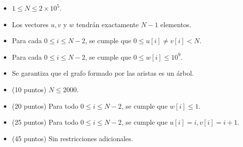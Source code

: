 \documentclass[12pt]{scrartcl}
\begin{document}
        


    \eject
    
        \begin{itemize}
            \item $1 \le N \le 2\times10^5$.
            \item Los vectores $u, v$ y $w$ tendrán exactamente $N - 1$ elementos.
            \item Para cada $0 \le i \le N - 2$, se cumple que $0 \le u[i] \neq v[i] < N$. 
            \item Para cada $0 \le i \le N - 2$, se cumple que $0 \le w[i] \le 10^9$.
            \item Se garantiza que el grafo formado por las aristas es un árbol.
        \end{itemize}
    


    \begin{itemize}
        \item (10 puntos) $N \le 2000$.
        \item (20 puntos) Para todo $0 \le i \le N - 2$, se cumple que $w[i] \le 1$.
        \item (25 puntos) Para todo $0 \le i \le N - 2$, se cumple que $u[i] = i, v[i] = i + 1$.
        \item (45 puntos) Sin restricciones adicionales.
    \end{itemize}
\end{document}
